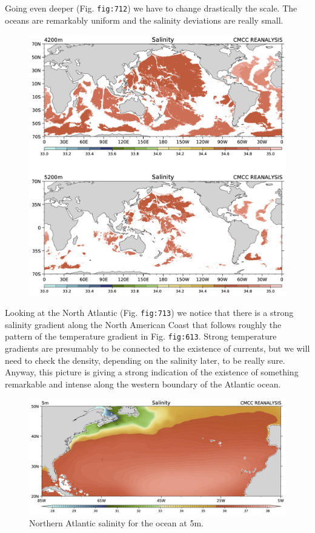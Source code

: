 Going even deeper (Fig. \texttt{fig:712}) we have to change drastically
the scale. The oceans are remarkably uniform and the salinity deviations
are really small.

\begin{figure}
	\centering
	\includegraphics[width = .7 \textwidth]{figs/GD/Sal4200-5200.png}
	\caption{} \label{fig:}
\end{figure}

Looking at the North Atlantic (Fig. \texttt{fig:713}) we notice that
there is a strong salinity gradient along the North American Coast that
follows roughly the pattern of the temperature gradient in Fig.
\texttt{fig:613}. Strong temperature gradients are presumably to be
connected to the existence of currents, but we will need to check the
density, depending on the salinity later, to be really sure. Anyway,
this picture is giving a strong indication of the existence of something
remarkable and intense along the western boundary of the Atlantic ocean.

\begin{figure}
	\centering
	\includegraphics[width = .7 \textwidth]{figs/GD/SGulf5.png}
	\caption{Northern Atlantic salinity for the ocean at 5m.}
\end{figure}

